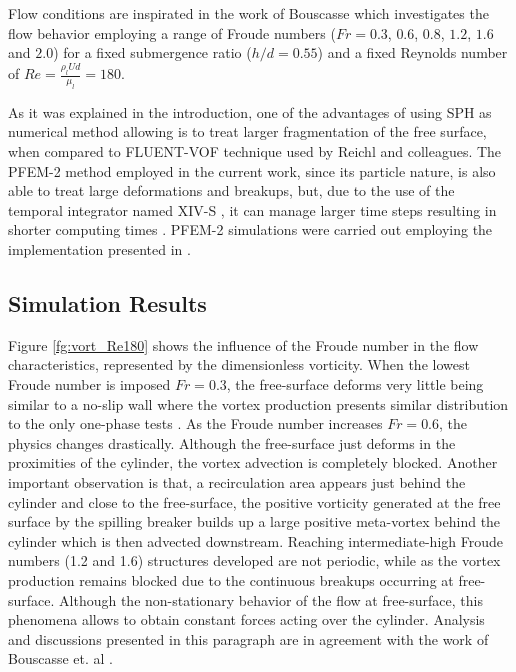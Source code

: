 Flow conditions are inspirated in the work of Bouscasse \cite{Bouscasse14} which investigates the flow behavior employing a range of Froude numbers ($Fr=0.3$, $0.6$, $0.8$, $1.2$, $1.6$ and $2.0$) for a fixed submergence ratio ($h/d=0.55$) and a fixed Reynolds number of $Re=\frac{\rho_l U d}{\mu_l}=180$.

As it was explained in the introduction, one of the advantages of using SPH as numerical method allowing is to treat larger fragmentation of the free surface, when compared to FLUENT-VOF technique used by Reichl and colleagues. The PFEM-2 method employed in the current work, since its particle nature, is also able to treat large deformations and breakups, but, due to the use of the temporal integrator named XIV-S \cite{Idelsohn12}, it can manage larger time steps resulting in shorter computing times \cite{Gimenez2015186}. PFEM-2 simulations were carried out employing the implementation presented in \cite{Gimenez14}.



\subsection{Simulation Results}

Figure \ref{fg:vort_Re180} shows the influence of the Froude number in the flow characteristics, represented by the dimensionless vorticity. When the lowest Froude number is imposed $Fr=0.3$, the free-surface deforms very little being similar to a no-slip wall where the vortex production presents similar distribution to the only one-phase tests \cite{PRICE2002175}. As the Froude number increases $Fr=0.6$, the physics changes drastically. Although the free-surface just deforms in the proximities of the cylinder, the vortex advection is completely blocked. Another important observation is that, a recirculation area appears just behind the cylinder and close to the free-surface, the positive vorticity generated at the free surface by the spilling breaker builds up a large positive meta-vortex behind the cylinder which is then advected downstream. Reaching intermediate-high Froude numbers (1.2 and 1.6) structures developed are not periodic, while as the vortex production remains blocked due to the continuous breakups occurring at free-surface. Although the non-stationary behavior of the flow at free-surface, this phenomena allows to obtain constant forces acting over the cylinder. Analysis and discussions presented in this paragraph are in agreement with the work of Bouscasse et. al \cite{Bouscasse14}.

